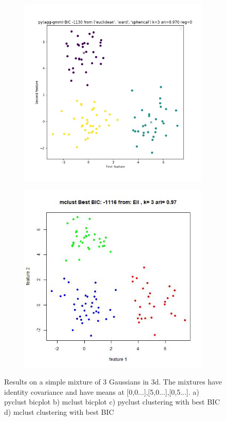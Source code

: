 \documentclass{article}
\begin{document}
\begin{figure}[h!]
\begin{subfigure}[b]{0.35\linewidth}
\caption{}
\end{subfigure} 
\begin{subfigure}[b]{0.35\linewidth}
  \includegraphics[width=\linewidth]{lowd_python_bestbic.jpg}
\caption{}
\end{subfigure}
\begin{subfigure}[b]{0.35\linewidth}
  \includegraphics[width=\linewidth]{lowd_r_bestbic.jpg}
\caption{}
\end{subfigure} 

\caption{Results on a simple mixture of 3 Gaussians in 3d. The mixtures have identity covariance and have means at [0,0...],[5,0...],[0,5...]. a) pyclust bicplot b) mclust bicplot c) pyclust clustering with best BIC d) mclust clustering with best BIC}
\end{figure}
\end{document}
